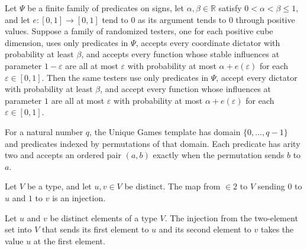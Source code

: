 \begin{theorem}
\label{FABL.IsDictatorVsNoNotablesTest.toNoInfluentials}
\leanok
{}
Let $\Psi$ be a finite family of predicates on signs, let $\alpha,\beta\in\mathbb R$
satisfy $0<\alpha<\beta\le1$, and let $e:[0,1]\to[0,1]$ tend to $0$ as its argument
tends to $0$ through positive values. Suppose a family of randomized testers, one for
each positive cube dimension, uses only predicates in $\Psi$, accepts every coordinate
dictator with probability at least $\beta$, and accepts every function whose stable
influences at parameter $1-\varepsilon$ are all at most $\varepsilon$ with probability
at most $\alpha+e(\varepsilon)$ for each $\varepsilon\in[0,1]$. Then the same testers
use only predicates in $\Psi$, accept every dictator with probability at least $\beta$,
and accept every function whose influences at parameter $1$ are all at most
$\varepsilon$ with probability at most $\alpha+e(\varepsilon)$ for each
$\varepsilon\in[0,1]$.
\end{theorem}

\begin{definition}
\label{FABL.uniqueGamesTemplate}
\leanok
{}
For a natural number $q$, the Unique Games template has domain $\{0,\ldots,q-1\}$ and
predicates indexed by permutations of that domain. Each predicate has arity two and
accepts an ordered pair $(a,b)$ exactly when the permutation sends $b$ to $a$.
\end{definition}

\begin{definition}
\label{FABL.binaryInjectiveScope}
\leanok
Let $V$ be a type, and let $u,v\in V$ be distinct. The map from $\in 2$ to $V$ sending
$0$ to $u$ and $1$ to $v$ is an injection.
\end{definition}

\begin{theorem}
\label{FABL.binaryInjectiveScope_zero}
\leanok
{}
Let $u$ and $v$ be distinct elements of a type $V$. The injection from the two-element
set into $V$ that sends its first element to $u$ and its second element to $v$ takes the
value $u$ at the first element.
\end{theorem}

